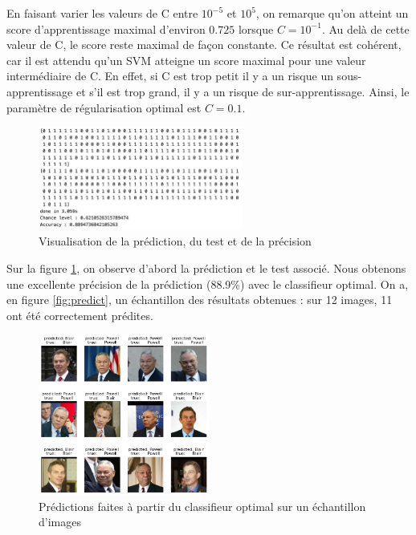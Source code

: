 \documentclass[a4paper,12pt]{article}
\begin{document}
En faisant varier les valeurs de C entre $10^{-5}$ et $10^{5}$, on remarque qu'on atteint un score d'apprentissage maximal d'environ $0.725$ lorsque $C=10^{-1}$.
Au delà de cette valeur de C, le score reste maximal de façon constante.
Ce résultat est cohérent, car il est attendu qu’un SVM atteigne un score maximal pour une valeur intermédiaire de 
C. En effet, si C est trop petit il y a un risque un sous-apprentissage et s'il est trop grand, il y a un risque de sur-apprentissage.
Ainsi, le paramètre de régularisation optimal est $C=0.1$.


\begin{figure}[H]    
        \centering    
        \includegraphics[width=0.6\textwidth]{Images/label_prediction.png}
        \caption{Visualisation de la prédiction, du test et de la précision}
        \label{fig:precision}
\end{figure}

Sur la figure \ref{fig:precision}, on observe d'abord la prédiction et le test associé.
Nous obtenons une excellente précision de la prédiction (88.9\%) avec le classifieur optimal. 
On a, en figure \ref{fig:predict}, un échantillon des résultats obtenues : sur 12 images, 11 ont été correctement prédites.

\begin{figure}[H]
    \centering
    \includegraphics[width=0.5\textwidth]{Images/prediction_visage.png}
    \caption{Prédictions faites à partir du classifieur optimal sur un échantillon d'images}
    \label{ref:predict}
\end{figure}
\end{document}
